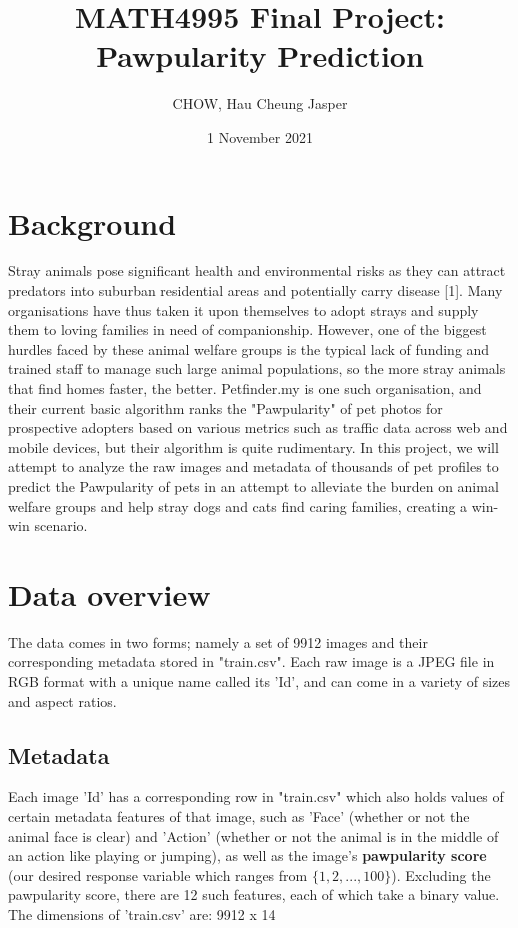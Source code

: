 \documentclass[12pt]{article}
\title{MATH4995 Final Project: Pawpularity Prediction}
\author{CHOW, Hau Cheung Jasper}
\date{1 November 2021}
\begin{document}
\maketitle

\section{Background}
Stray animals pose significant health and environmental risks as they can attract predators into suburban residential areas and potentially carry disease [1]. Many organisations have thus taken it upon themselves to adopt strays and supply them to loving families in need of companionship. However, one of the biggest hurdles faced by these animal welfare groups is the typical lack of funding and trained staff to manage such large animal populations, so the more stray animals that find homes faster, the better. Petfinder.my is one such organisation, and their current basic algorithm ranks the "Pawpularity" of pet photos for prospective adopters based on various metrics such as traffic data across web and mobile devices, but their algorithm is quite rudimentary. In this project, we will attempt to analyze the raw images and metadata of thousands of pet profiles to predict the Pawpularity of pets in an attempt to alleviate the burden on animal welfare groups and help stray dogs and cats find caring families, creating a win-win scenario.

\section{Data overview}
The data comes in two forms; namely a set of 9912 images and their corresponding metadata stored in "train.csv". Each raw image is a JPEG file in RGB format with a unique name called its 'Id', and can come in a variety of sizes and aspect ratios.

\subsection{Metadata}

Each image 'Id' has a corresponding row in "train.csv" which also holds values of certain metadata features of that image, such as 'Face' (whether or not the animal face is clear) and 'Action' (whether or not the animal is in the middle of an action like playing or jumping), as well as the image's \textbf{pawpularity score} (our desired response variable which ranges from $\{1,2,...,100\}$). Excluding the pawpularity score, there are 12 such features, each of which take a binary value. The dimensions of 'train.csv' are: 9912 x 14\newline
\end{document}
